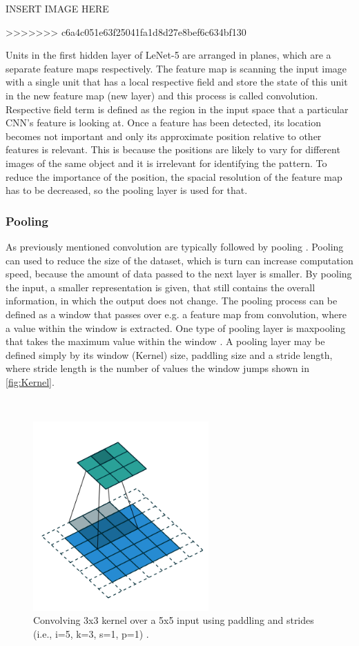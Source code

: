 INSERT IMAGE HERE

>>>>>>> c6a4c051e63f25041fa1d8d27e8bef6c634bf130

Units in the first hidden layer of LeNet-5 are arranged in planes, which are a separate feature maps respectively. The feature map is scanning the input image with a single unit that has a local respective field and store the state of this unit in the new feature map (new layer) and this process is called convolution. Respective field term is defined as the region in the input space that a particular CNN's feature is looking at. Once a feature has been detected, its location becomes not important and only its approximate position relative to other features is relevant. This is because the positions are likely to vary for different images of the same object and it is irrelevant for identifying the pattern. To reduce the importance of the position, the spacial resolution of the feature map has to be decreased, so the pooling layer is used for that.\citep{LeCun1998}



\subsubsection{Pooling}
As previously mentioned convolution are typically followed by pooling \citep{LeCun2015, Goodfellow0216}. 
Pooling can used to reduce the size of the dataset, which is turn can increase computation speed, because the amount of data passed to the next layer is smaller. By pooling the input, a smaller representation is given, that still contains the overall information, in which the output does not change. \citep{Goodfellow2016,LeCun1998}     
The pooling process can be defined as a window that passes over e.g. a feature map from convolution, where a value within the window is extracted. One type of pooling layer is maxpooling that takes the maximum value within the window \citep{Goodfellow2016,Dumoulin2016}. A pooling layer may be defined simply by its window (Kernel) size, paddling size and a stride length, where stride length is the number of values the window jumps shown in \autoref{fig:Kernel}. \citep{Dumoulin2016}

\\
\begin{figure} [H]
\centering
\includegraphics[width=0.6\textwidth]{figures/Kernel}
\caption{Convolving 3x3 kernel over a 5x5 input using paddling and strides (i.e., i=5, k=3, s=1, p=1) \citep{Dumoulin2016}.}
\label{fig:Kernel}  
\end{figure}
\\

